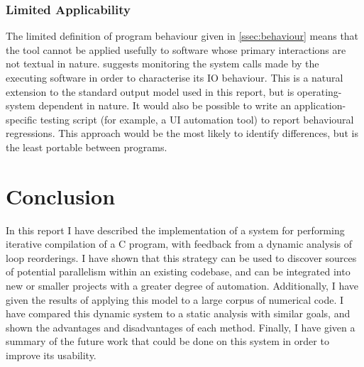 \documentclass[journal]{IEEEtran}
\begin{document}
\subsubsection{Limited Applicability} The limited definition of program
behaviour given in \autoref{ssec:behaviour} means that the tool cannot be
applied usefully to software whose primary interactions are not textual in
nature. \textcite{layton_io_2010} suggests monitoring the system calls made by
the executing software in order to characterise its IO behaviour. This is a
natural extension to the standard output model used in this report, but is
operating-system dependent in nature. It would also be possible to write an
application-specific testing script (for example, a UI automation tool) to
report behavioural regressions. This approach would be the most likely to
identify differences, but is the least portable between programs.

\section{Conclusion}

In this report I have described the implementation of a system for performing
iterative compilation of a C program, with feedback from a dynamic analysis of
loop reorderings. I have shown that this strategy can be used to discover
sources of potential parallelism within an existing codebase, and can be
integrated into new or smaller projects with a greater degree of automation.
Additionally, I have given the results of applying this model to a large corpus
of numerical code. I have compared this dynamic system to a static analysis with
similar goals, and shown the advantages and disadvantages of each method.
Finally, I have given a summary of the future work that could be done on this
system in order to improve its usability.

\ifCLASSOPTIONcaptionsoff
  \newpage
\fi

\printbibliography
\end{document}
